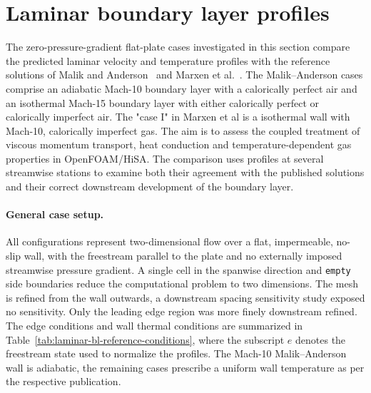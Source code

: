 \section{Laminar boundary layer profiles}
\label{sec:numerical-vv:laminar-boundary-layer-profiles}

The zero-pressure-gradient flat-plate cases investigated in this section compare the predicted laminar velocity and temperature profiles with the reference solutions of Malik and
Anderson~\citep{MalikAnderson1991RealGas} and Marxen et al.~\citep{Marxen2011HighOrder}. The Malik--Anderson cases comprise an adiabatic Mach-10 boundary layer with a calorically perfect air and an isothermal Mach-15 boundary layer with either calorically perfect or
calorically imperfect air. The "case I" in Marxen et al is a isothermal wall with Mach-10, calorically imperfect gas. The aim is to assess the coupled treatment of viscous momentum transport, heat conduction and temperature-dependent gas properties in OpenFOAM/HiSA. The comparison
uses profiles at several streamwise stations to examine both their agreement
with the published solutions and their correct downstream development of the boundary layer.

\paragraph{General case setup.}

All configurations represent two-dimensional flow over a flat, impermeable,
no-slip wall, with the freestream parallel to the plate and no externally
imposed streamwise pressure gradient. A single cell in the spanwise direction
and \texttt{empty} side boundaries reduce the computational problem to two
dimensions. The mesh is refined from the wall outwards, a downstream spacing sensitivity study exposed no sensitivity. Only the leading edge region was more finely downstream refined. The edge conditions and wall thermal conditions are summarized in Table~\ref{tab:laminar-bl-reference-conditions}, where the subscript \(e\) denotes
the freestream state used to normalize the profiles. The Mach-10
Malik--Anderson wall is adiabatic, the remaining cases prescribe a uniform wall temperature as per the respective publication.


